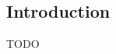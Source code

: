 \documentclass[dwyatte_dissertation.tex]{subfiles}
\begin{document}
\chapter{}

\section{Introduction}
TODO



\end{document}
